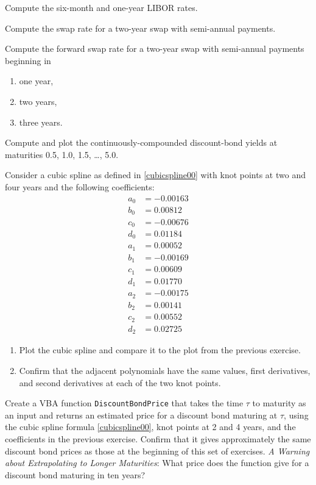 \begin{prob} Compute the six-month and one-year LIBOR rates.
\end{prob}\begin{prob} Compute the swap rate for a two-year swap with semi-annual payments.
\end{prob}\begin{prob} Compute the forward swap rate for a two-year swap with semi-annual payments beginning in 
\begin{enumerate}
\renewcommand{\labelenumi}{(\alph{enumi})}
\item one year,
\item two years,
\item three years.
\end{enumerate}
\end{prob}\begin{prob} Compute and plot the continuously-compounded discount-bond yields at maturities 0.5, 1.0, 1.5, \ldots, 5.0.
\end{prob}\begin{prob} Consider a cubic spline as defined in \eqref{cubicspline00} with knot points at two and four years and the following coefficients:
\begin{align*}
a_0 & =  -0.00163  \\
b_0 & =   0.00812\\
c_0 & =   -0.00676 \\
d_0 & =    0.01184\\
a_1 & =    0.00052\\
b_1 & =    -0.00169\\
c_1 & =    0.00609\\
d_1 & =    0.01770\\
a_2 & =    -0.00175\\
b_2 & =    0.00141\\
c_2 & =    0.00552\\
d_2 & =    0.02725
\end{align*}
\begin{enumerate}
\renewcommand{\labelenumi}{(\alph{enumi})}
\item Plot the cubic spline and compare it to the plot from the previous exercise.
\item Confirm that the adjacent polynomials have the same values, first derivatives, and second derivatives at each of the two knot points.
\end{enumerate}
\end{prob}\begin{prob} Create a VBA function \verb!DiscountBondPrice! that takes the time $\tau$ to maturity as an input and returns an estimated price for a discount bond maturing at $\tau$, using the cubic spline formula \eqref{cubicspline00}, knot points at 2 and 4 years, and the coefficients in the previous exercise.  Confirm that it gives approximately the same discount bond prices as those at the beginning of this set of exercises.  \emph{A Warning about Extrapolating to Longer Maturities}:  What price does the function give for a discount bond maturing in ten years?

\end{prob}
